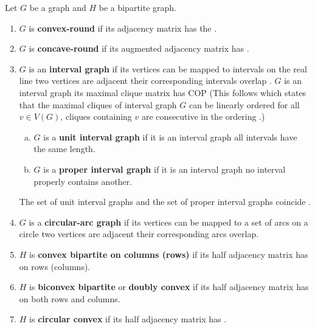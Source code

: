 \begin{definition} %
  \label{def:graphwithcop} %
  Let $G$ be a graph and $H$ be a bipartite graph.
  \begin{enumerate}
  \item $G$ is \textbf{convex-round} if its adjacency matrix has the
    \CROP.
  \item \label{def::concave-round} $G$ is \textbf{concave-round} if its
    augmented adjacency matrix has \CROP. \cite{bhy00}
  \item $G$ is an \textbf{interval graph} if its vertices can be mapped
    to intervals on the real line \stt two vertices are adjacent \iff
    their corresponding intervals overlap \cite{sb59}.  $G$ is an interval graph \iff its maximal clique matrix
    has COP \cite{fg65} (This follows \cite{gh64} which states
      that the maximal cliques of interval graph $G$ can be linearly
      ordered \stt for all $v \in V(G)$, cliques containing $v$ are
      consecutive in the ordering \cite[Th. 8.1]{mcg04}.)
    \begin{enumerate}[a.]
    \item $G$ is a \textbf{unit interval graph} if it is an interval
      graph \stt all intervals have the same length.
    \item $G$ is a \textbf{proper interval graph} if it is an interval
      graph \stt no interval properly contains another.
    \end{enumerate}
    The set of unit interval graphs and the set of proper interval
    graphs coincide \cite{rob69, gar07}.
 \item $G$ is a \textbf{circular-arc graph} if its vertices can be
    mapped to a set of arcs on a circle \stt two vertices are adjacent
    \iff their corresponding arcs overlap.
  \item $H$ is \textbf{convex bipartite on columns (rows)} if its half
    adjacency matrix has \COP on rows (columns).%
    \label{def::convexbi}
  \item $H$ is \textbf{biconvex bipartite} or \textbf{doubly
      convex}\cite{yc95} if its half adjacency matrix has \COP on both
    rows and columns.
  \item $H$ is \textbf{circular convex} if its half adjacency matrix has
    \CROP.
  \end{enumerate}
\end{definition}

